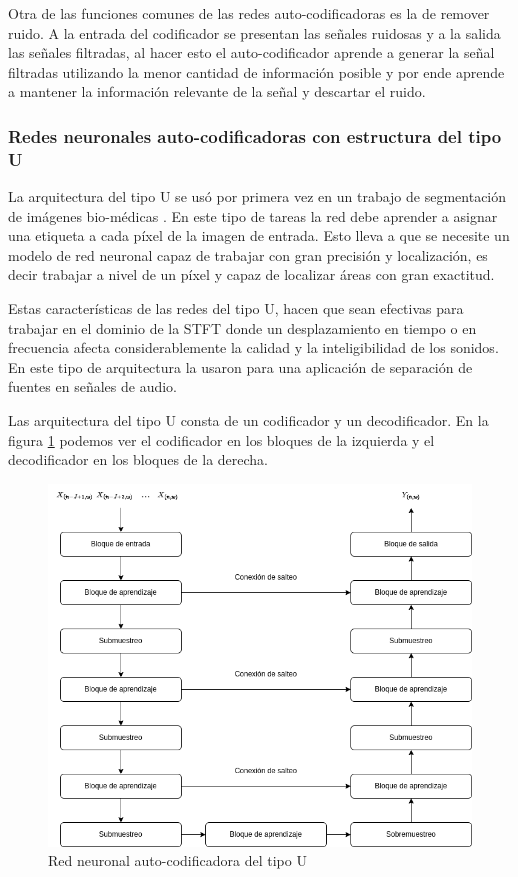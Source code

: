 Otra de las funciones comunes de las redes auto-codificadoras es la de remover ruido. A la entrada del codificador se presentan las señales ruidosas y a la salida las señales filtradas, al hacer esto el auto-codificador aprende a generar la señal filtradas utilizando la menor cantidad de información posible y por ende aprende a mantener la información relevante de la señal y descartar el ruido.

\subsubsection{Redes neuronales auto-codificadoras con estructura del tipo U}
\label{sec:redes_tipo_u}

La arquitectura del tipo U se usó por primera vez en un trabajo de segmentación de imágenes bio-médicas \cite{U_Net_Convolutional_Networks_for_Biomedical_Image_Segmentation}. En este tipo de tareas la red debe aprender a asignar una etiqueta a cada píxel de la imagen de entrada. Esto lleva a que se necesite un modelo de red neuronal capaz de trabajar con gran precisión y localización, es decir trabajar a nivel de un píxel y capaz de localizar áreas con gran exactitud.

Estas características de las redes del tipo U, hacen que sean efectivas para trabajar en el dominio de la STFT donde un desplazamiento en tiempo o en frecuencia afecta considerablemente la calidad y la inteligibilidad de los sonidos. En \cite{singing_voice_separation_with_deep_u_net_convolutional_networks} este tipo de arquitectura la usaron para una aplicación de separación de fuentes en señales de audio.

Las arquitectura del tipo U consta de un codificador y un decodificador. En la figura \ref{fig:ch3_unet} podemos ver el codificador en los bloques de la izquierda y el decodificador en los bloques de la derecha.

\begin{figure}
	\centering
	\centerline{\includegraphics[scale=0.65]{images/ch3/unet.png}}
	\caption{Red neuronal auto-codificadora del tipo U}
	\label{fig:ch3_unet}
\end{figure}

